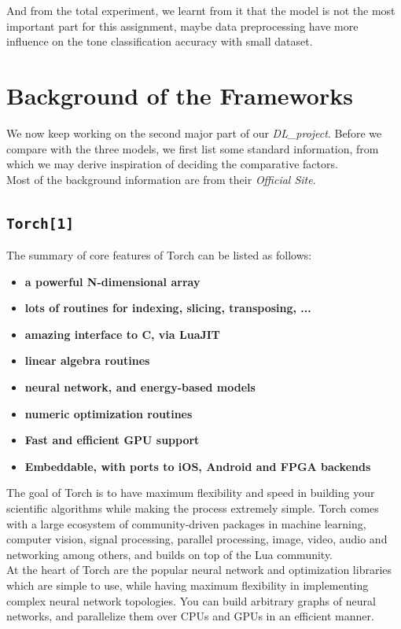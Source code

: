 \documentclass[12pt]{article}
\begin{document}
And from the total experiment, we learnt from it that the model is not the most important part for this assignment, maybe data preprocessing have more influence on the tone classification accuracy with small dataset.


\section{Background of the Frameworks}

We now keep working on the second major part of our {\it DL\_project}. Before we compare with the three models, we first list some standard information, from which we may derive inspiration of deciding the comparative factors.\\
Most of the background information are from their {\it Official Site}.

\subsection{\texttt{Torch[1]}}
The summary of core features of Torch can be listed as follows:
\begin{itemize}
	\item {\bf a powerful N-dimensional array}
	\item {\bf lots of routines for indexing, slicing, transposing, ...}
	\item {\bf amazing interface to C, via LuaJIT}
	\item {\bf linear algebra routines}
	\item {\bf neural network, and energy-based models}
	\item {\bf numeric optimization routines}
	\item {\bf Fast and efficient GPU support}
	\item {\bf Embeddable, with ports to iOS, Android and FPGA backends}
\end{itemize}
The goal of Torch is to have maximum flexibility and speed in building your scientific algorithms while making the process extremely simple. Torch comes with a large ecosystem of community-driven packages in machine learning, computer vision, signal processing, parallel processing, image, video, audio and networking among others, and builds on top of the Lua community.\\
At the heart of Torch are the popular neural network and optimization libraries which are simple to use, while having maximum flexibility in implementing complex neural network topologies. You can build arbitrary graphs of neural networks, and parallelize them over CPUs and GPUs in an efficient manner.
\end{document}
